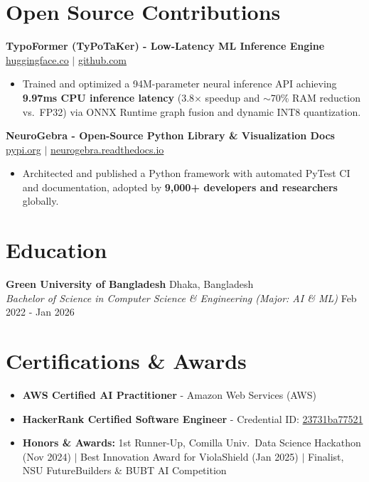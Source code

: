 \documentclass[9.5pt,a4paper]{article}
\begin{document}
\section*{Open Source Contributions}
\noindent
\textbf{TypoFormer (TyPoTaKer) - Low-Latency ML Inference Engine} \hfill \href{https://huggingface.co/fahiiim/TypoFormer}{huggingface.co} $\vert$ \href{https://github.com/fahiiim/TyPoTaKer}{github.com}
\begin{itemize}
    \item Trained and optimized a 94M-parameter neural inference API achieving \textbf{9.97ms CPU inference latency} (3.8$\times$ speedup and $\sim$70\% RAM reduction vs.\ FP32) via ONNX Runtime graph fusion and dynamic INT8 quantization.
\end{itemize}
\vspace{0.6pt}
\noindent
\textbf{NeuroGebra - Open-Source Python Library \& Visualization Docs} \hfill \href{https://pypi.org/project/neurogebra/}{pypi.org} $\vert$ \href{https://neurogebra.readthedocs.io}{neurogebra.readthedocs.io}
\begin{itemize}
    \item Architected and published a Python framework with automated PyTest CI and documentation, adopted by \textbf{9,000+ developers and researchers} globally.
\end{itemize}
\vspace{0.6pt}

\section*{Education}
\noindent
\textbf{Green University of Bangladesh} \hfill Dhaka, Bangladesh\\
\textit{Bachelor of Science in Computer Science \& Engineering (Major: AI \& ML)} \hfill Feb 2022 - Jan 2026

\section*{Certifications \& Awards}
\begin{itemize}
    \item \textbf{AWS Certified AI Practitioner} - Amazon Web Services (AWS)
    \item \textbf{HackerRank Certified Software Engineer} - Credential ID: \href{https://www.hackerrank.com/certificates/23731ba77521}{23731ba77521}
    \item \textbf{Honors \& Awards:} 1st Runner-Up, Comilla Univ.\ Data Science Hackathon (Nov 2024) $\vert$ Best Innovation Award for ViolaShield (Jan 2025) $\vert$ Finalist, NSU FutureBuilders \& BUBT AI Competition
\end{itemize}
\end{document}
